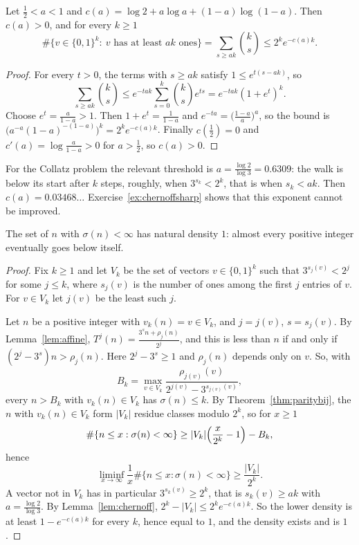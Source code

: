 \begin{lemma}\label{lem:chernoff}
Let $\frac12<a<1$ and $c(a)=\log2+a\log a+(1-a)\log(1-a)$. Then $c(a)>0$, and for every $k\ge1$
\[
\#\bigl\{v\in\{0,1\}^k:\ v\text{ has at least }ak\text{ ones}\bigr\}=\sum_{s\ge ak}\binom ks\le2^ke^{-c(a)k}.
\]
\end{lemma}
\begin{proof}
For every $t>0$, the terms with $s\ge ak$ satisfy $1\le e^{t(s-ak)}$, so
\[
\sum_{s\ge ak}\binom ks\le e^{-tak}\sum_{s=0}^k\binom kse^{ts}=e^{-tak}(1+e^t)^k.
\]
Choose $e^t=\frac a{1-a}>1$. Then $1+e^t=\frac1{1-a}$ and $e^{-ta}=\bigl(\frac{1-a}a\bigr)^a$, so the bound is
$\bigl(a^{-a}(1-a)^{-(1-a)}\bigr)^k=2^ke^{-c(a)k}$. Finally $c(\frac12)=0$ and $c'(a)=\log\frac a{1-a}>0$ for $a>\frac12$, so $c(a)>0$.
\end{proof}

For the Collatz problem the relevant threshold is $a=\frac{\log2}{\log3}=0.6309$: the walk is below its start after $k$ steps, roughly, when
$3^{s_k}<2^k$, that is when $s_k<ak$. Then $c(a)=0.03468\ldots$ Exercise~\ref{ex:chernoffsharp} shows that this exponent cannot be improved.

\begin{theorem}[Terras, 1976]\label{thm:terras}
The set of $n$ with $\sigma(n)<\infty$ has natural density $1$: almost every positive integer eventually goes below itself.
\end{theorem}
\begin{proof}
Fix $k\ge1$ and let $V_k$ be the set of vectors $v\in\{0,1\}^k$ such that $3^{s_j(v)}<2^j$ for some $j\le k$, where $s_j(v)$ is the number of ones among
the first $j$ entries of $v$. For $v\in V_k$ let $j(v)$ be the least such $j$.

Let $n$ be a positive integer with $v_k(n)=v\in V_k$, and $j=j(v)$, $s=s_j(v)$. By Lemma~\ref{lem:affine}, $T^j(n)=\frac{3^sn+\rho_j(n)}{2^j}$, and this
is less than $n$ if and only if $(2^j-3^s)n>\rho_j(n)$. Here $2^j-3^s\ge1$ and $\rho_j(n)$ depends only on $v$. So, with
\[
B_k=\max_{v\in V_k}\frac{\rho_{j(v)}(v)}{2^{j(v)}-3^{s_{j(v)}(v)}},
\]
every $n>B_k$ with $v_k(n)\in V_k$ has $\sigma(n)\le k$. By Theorem~\ref{thm:paritybij}, the $n$ with $v_k(n)\in V_k$ form $|V_k|$ residue classes
modulo $2^k$, so for $x\ge1$
\[
\#\{n\le x:\sigma(n)<\infty\}\ge|V_k|\Bigl(\frac x{2^k}-1\Bigr)-B_k,
\]
hence
\[
\liminf_{x\to\infty}\frac1x\#\{n\le x:\sigma(n)<\infty\}\ge\frac{|V_k|}{2^k}.
\]
A vector not in $V_k$ has in particular $3^{s_k(v)}\ge2^k$, that is $s_k(v)\ge ak$ with $a=\frac{\log2}{\log3}$. By Lemma~\ref{lem:chernoff},
$2^k-|V_k|\le2^ke^{-c(a)k}$. So the lower density is at least $1-e^{-c(a)k}$ for every $k$, hence equal to $1$, and the density exists and is $1$.
\end{proof}

